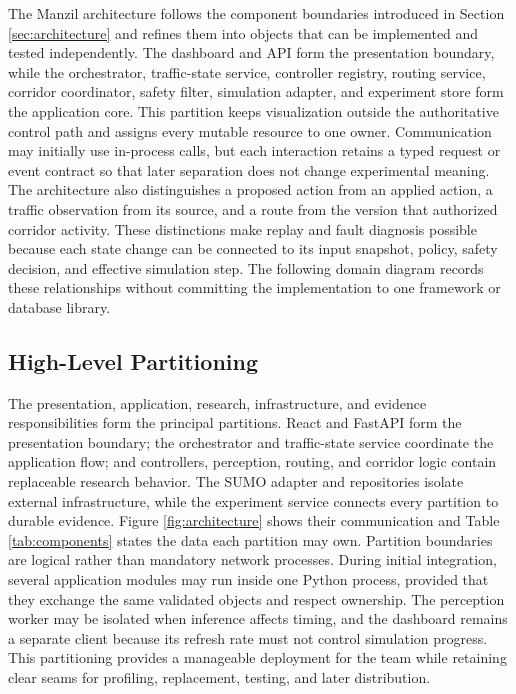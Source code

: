 The Manzil architecture follows the component boundaries introduced in Section \ref{sec:architecture} and refines them into objects that can be implemented and tested independently. The dashboard and API form the presentation boundary, while the orchestrator, traffic-state service, controller registry, routing service, corridor coordinator, safety filter, simulation adapter, and experiment store form the application core. This partition keeps visualization outside the authoritative control path and assigns every mutable resource to one owner. Communication may initially use in-process calls, but each interaction retains a typed request or event contract so that later separation does not change experimental meaning. The architecture also distinguishes a proposed action from an applied action, a traffic observation from its source, and a route from the version that authorized corridor activity. These distinctions make replay and fault diagnosis possible because each state change can be connected to its input snapshot, policy, safety decision, and effective simulation step. The following domain diagram records these relationships without committing the implementation to one framework or database library.

\subsection{High-Level Partitioning}

The presentation, application, research, infrastructure, and evidence responsibilities form the principal partitions. React and FastAPI form the presentation boundary; the orchestrator and traffic-state service coordinate the application flow; and controllers, perception, routing, and corridor logic contain replaceable research behavior. The SUMO adapter and repositories isolate external infrastructure, while the experiment service connects every partition to durable evidence. Figure \ref{fig:architecture} shows their communication and Table \ref{tab:components} states the data each partition may own. Partition boundaries are logical rather than mandatory network processes. During initial integration, several application modules may run inside one Python process, provided that they exchange the same validated objects and respect ownership. The perception worker may be isolated when inference affects timing, and the dashboard remains a separate client because its refresh rate must not control simulation progress. This partitioning provides a manageable deployment for the team while retaining clear seams for profiling, replacement, testing, and later distribution.

